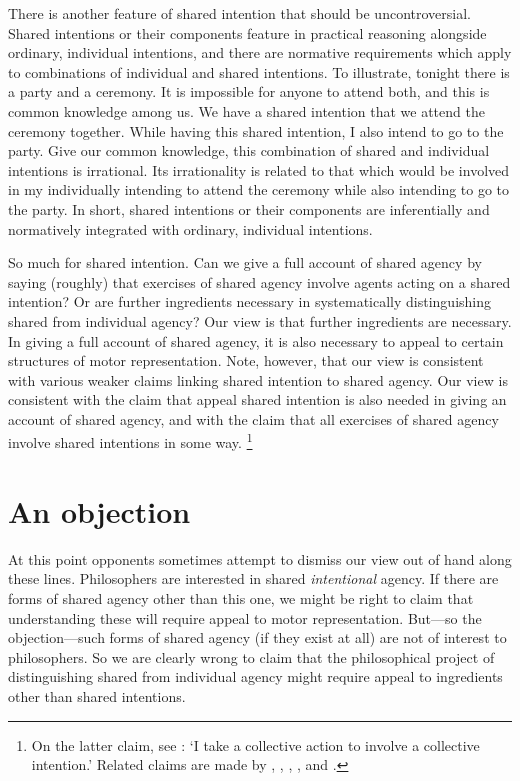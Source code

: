\documentclass[12pt,\papersize]{extarticle}
\begin{document}
There is another feature of shared intention that should be uncontroversial.  
Shared intentions or their components feature in practical reasoning alongside ordinary, individual intentions,
 and there are normative requirements which apply to combinations of individual and shared intentions.
To illustrate, tonight there is a party and a ceremony.
It is impossible for anyone to attend both, and this is common knowledge among us.
We have a shared intention that we attend the ceremony together.
While having this shared intention, I also intend to go to the party. 
Give our common knowledge,
this combination of shared and individual intentions is irrational. 
Its irrationality is related to that which would be involved in my individually intending to attend the ceremony while also intending to go to the party.
In short, shared intentions or their components are inferentially and normatively integrated with ordinary, individual intentions.

So much for shared intention.
Can we give a full account of shared agency by saying (roughly) that exercises of shared agency involve agents acting on a shared intention?
Or are further ingredients necessary in systematically distinguishing shared from individual  agency?
Our view is that further ingredients are necessary.
In giving a full account of shared agency, it is also necessary to appeal to certain structures of motor representation. 
Note, however, that our view is consistent with various weaker claims linking shared intention to shared agency.
Our view is consistent with the claim that appeal shared intention is also needed in giving an account of shared agency,  
and with the claim that all exercises of shared agency involve shared intentions in some way.%
\footnote{
On the latter claim, see \citet[p.\ 5]{Gilbert:2006wr}: `I take a collective action to involve a collective intention.'  
Related claims are made by 
	\citet[p.\ 381]{Carpenter:2009wq}, 
	\citet[p.\ 369]{Call:2009fk}, 
	\citet{Kutz:2000si},  
	\citet[p.\ 117]{rakoczy_pretend_2006},  and
	\citet{Tollefsen:2005vh}.
}



\section{An objection}
At this point opponents sometimes attempt to dismiss our view out of hand along these lines.
Philosophers are interested in shared \emph{intentional} agency. 
If there are forms of shared agency other than this one, we might be right to claim that understanding these will require appeal to motor representation.
But---so the objection---such forms of shared agency (if they exist at all) are not of interest to philosophers. 
So we are clearly wrong to claim that the philosophical project of distinguishing shared from individual agency might require appeal to ingredients other than shared intentions.
\end{document}
